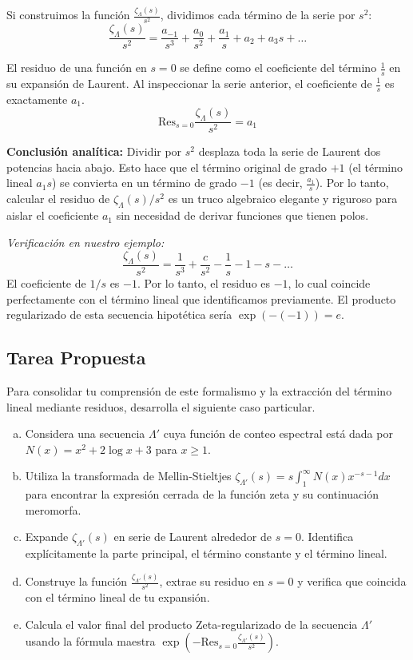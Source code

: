 Si construimos la función $\frac{\zeta_\Lambda(s)}{s^2}$, dividimos cada término de la serie por $s^2$:
$$ \frac{\zeta_\Lambda(s)}{s^2} = \frac{a_{-1}}{s^3} + \frac{a_0}{s^2} + \frac{a_1}{s} + a_2 + a_3 s + \dots $$

El residuo de una función en $s=0$ se define como el coeficiente del término $\frac{1}{s}$ en su expansión de Laurent. Al inspeccionar la serie anterior, el coeficiente de $\frac{1}{s}$ es exactamente $a_1$.
$$ \text{Res}_{s=0} \frac{\zeta_\Lambda(s)}{s^2} = a_1 $$

\textbf{Conclusión analítica:} Dividir por $s^2$ desplaza toda la serie de Laurent dos potencias hacia abajo. Esto hace que el término original de grado $+1$ (el término lineal $a_1 s$) se convierta en un término de grado $-1$ (es decir, $\frac{a_1}{s}$). Por lo tanto, calcular el residuo de $\zeta_\Lambda(s)/s^2$ es un truco algebraico elegante y riguroso para aislar el coeficiente $a_1$ sin necesidad de derivar funciones que tienen polos.

\textit{Verificación en nuestro ejemplo:}
$$ \frac{\zeta_\Lambda(s)}{s^2} = \frac{1}{s^3} + \frac{c}{s^2} - \frac{1}{s} - 1 - s - \dots $$
El coeficiente de $1/s$ es $-1$. Por lo tanto, el residuo es $-1$, lo cual coincide perfectamente con el término lineal que identificamos previamente. El producto regularizado de esta secuencia hipotética sería $\exp(-(-1)) = e$.

\subsection{Tarea Propuesta}

Para consolidar tu comprensión de este formalismo y la extracción del término lineal mediante residuos, desarrolla el siguiente caso particular.

\begin{enumerate}[a)]
    \item Considera una secuencia $\Lambda'$ cuya función de conteo espectral está dada por $N(x) = x^2 + 2\log x + 3$ para $x \ge 1$.
    \item Utiliza la transformada de Mellin-Stieltjes $\zeta_{\Lambda'}(s) = s \int_1^\infty N(x) x^{-s-1} dx$ para encontrar la expresión cerrada de la función zeta y su continuación meromorfa.
    \item Expande $\zeta_{\Lambda'}(s)$ en serie de Laurent alrededor de $s=0$. Identifica explícitamente la parte principal, el término constante y el término lineal.
    \item Construye la función $\frac{\zeta_{\Lambda'}(s)}{s^2}$, extrae su residuo en $s=0$ y verifica que coincida con el término lineal de tu expansión.
    \item Calcula el valor final del producto Zeta-regularizado de la secuencia $\Lambda'$ usando la fórmula maestra $\exp(-\text{Res}_{s=0} \frac{\zeta_{\Lambda'}(s)}{s^2})$.
\end{enumerate}





